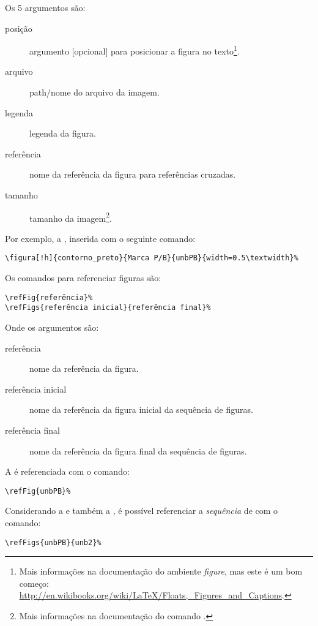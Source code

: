Os 5 argumentos são:
\begin{description}
	\item[posição] argumento [opcional] para posicionar a figura no texto\footnote{Mais
		informações na documentação do ambiente \emph{figure}, mas este é um bom começo: 
		\url{http://en.wikibooks.org/wiki/LaTeX/Floats,_Figures_and_Captions}.}.
	\item[arquivo] path/nome do arquivo da imagem.
	\item[legenda] legenda da figura.
	\item[referência] nome da referência da figura para referências cruzadas.
	\item[tamanho] tamanho da imagem\footnote{Mais informações na documentação do comando
		.}.
\end{description}

Por exemplo, a , inserida com o seguinte comando:

\begin{verbatim}
\figura[!h]{contorno_preto}{Marca P/B}{unbPB}{width=0.5\textwidth}%
\end{verbatim}

%

Os comandos para referenciar figuras são:

\begin{verbatim}
\refFig{referência}%
\refFigs{referência inicial}{referência final}%
\end{verbatim}

Onde os argumentos são:
\begin{description}
	\item[referência] nome da referência da figura.
	\item[referência inicial] nome da referência da figura inicial da sequência de figuras.
	\item[referência final] nome da referência da figura final da sequência de figuras.
\end{description}

A  é referenciada com o comando:
\begin{verbatim}
\refFig{unbPB}%
\end{verbatim}

%

Considerando a  e também a , é possível referenciar
a \emph{sequência} de  com o comando:
\begin{verbatim}
\refFigs{unbPB}{unb2}%
\end{verbatim}

